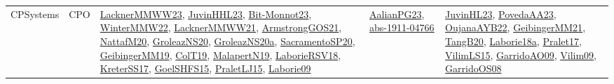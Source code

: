 {\begin{longtable}{lp{3cm}>{\raggedright}p{6cm}>{\raggedright}p{6cm}p{8cm}}
CPSystems & CPO & \href{articles/LacknerMMWW23.pdf}{LacknerMMWW23}\cite{LacknerMMWW23}, \href{papers/JuvinHHL23.pdf}{JuvinHHL23}\cite{JuvinHHL23}, \href{papers/Bit-Monnot23.pdf}{Bit-Monnot23}\cite{Bit-Monnot23}, \href{papers/WinterMMW22.pdf}{WinterMMW22}\cite{WinterMMW22}, \href{papers/LacknerMMWW21.pdf}{LacknerMMWW21}\cite{LacknerMMWW21}, \href{papers/ArmstrongGOS21.pdf}{ArmstrongGOS21}\cite{ArmstrongGOS21}, \href{papers/NattafM20.pdf}{NattafM20}\cite{NattafM20}, \href{papers/GroleazNS20.pdf}{GroleazNS20}\cite{GroleazNS20}, \href{papers/GroleazNS20a.pdf}{GroleazNS20a}\cite{GroleazNS20a}, \href{articles/SacramentoSP20.pdf}{SacramentoSP20}\cite{SacramentoSP20}, \href{papers/GeibingerMM19.pdf}{GeibingerMM19}\cite{GeibingerMM19}, \href{papers/ColT19.pdf}{ColT19}\cite{ColT19}, \href{papers/MalapertN19.pdf}{MalapertN19}\cite{MalapertN19}, \href{articles/LaborieRSV18.pdf}{LaborieRSV18}\cite{LaborieRSV18}, \href{articles/KreterSS17.pdf}{KreterSS17}\cite{KreterSS17}, \href{articles/GoelSHFS15.pdf}{GoelSHFS15}\cite{GoelSHFS15}, \href{papers/PraletLJ15.pdf}{PraletLJ15}\cite{PraletLJ15}, \href{papers/Laborie09.pdf}{Laborie09}\cite{Laborie09} & \href{papers/AalianPG23.pdf}{AalianPG23}\cite{AalianPG23}, \href{articles/abs-1911-04766.pdf}{abs-1911-04766}\cite{abs-1911-04766} & \href{papers/JuvinHL23.pdf}{JuvinHL23}\cite{JuvinHL23}, \href{papers/PovedaAA23.pdf}{PovedaAA23}\cite{PovedaAA23}, \href{papers/OujanaAYB22.pdf}{OujanaAYB22}\cite{OujanaAYB22}, \href{papers/GeibingerMM21.pdf}{GeibingerMM21}\cite{GeibingerMM21}, \href{papers/TangB20.pdf}{TangB20}\cite{TangB20}, \href{papers/Laborie18a.pdf}{Laborie18a}\cite{Laborie18a}, \href{papers/Pralet17.pdf}{Pralet17}\cite{Pralet17}, \href{papers/VilimLS15.pdf}{VilimLS15}\cite{VilimLS15}, \href{articles/GarridoAO09.pdf}{GarridoAO09}\cite{GarridoAO09}, \href{papers/Vilim09.pdf}{Vilim09}\cite{Vilim09}, \href{articles/GarridoOS08.pdf}{GarridoOS08}\cite{GarridoOS08}\\

\end{longtable}}
